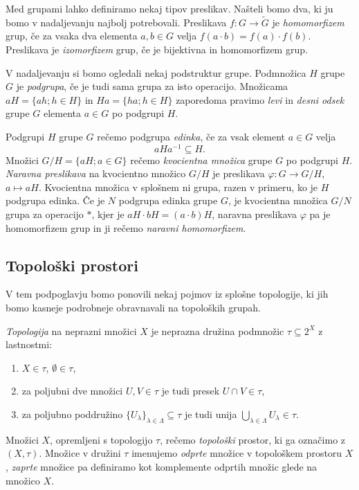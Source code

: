 \documentclass[mat1]{fmfdelo}
\begin{document}
Med grupami lahko definiramo nekaj tipov preslikav. Našteli bomo dva, ki ju bomo v nadaljevanju najbolj potrebovali.
Preslikava $f\colon G \to \widetilde{G}$ je \emph{homomorfizem} grup, če za vsaka dva elementa $a, b \in G$ velja $f(a\cdot b) = f(a)\cdot f(b)$.
Preslikava je \emph{izomorfizem} grup, če je bijektivna in homomorfizem grup.

V nadaljevanju si bomo ogledali nekaj podstruktur grupe.
Podmnožica $H$ grupe $G$ je \emph{podgrupa}, če je tudi sama grupa za isto operacijo.
Množicama $aH = \lbrace ah ; h \in H \rbrace$ in $Ha = \lbrace ha ; h \in H \rbrace$ zaporedoma pravimo \emph{levi} in \emph{desni odsek} grupe $G$ elementa $a \in G$ po podgrupi $H$.

Podgrupi $H$ grupe $G$ rečemo podgrupa \emph{edinka}, če za vsak element $a \in G$ velja \[aHa^{-1} \subseteq H.\]
Množici $G/H = \lbrace aH ; a \in G \rbrace$ rečemo \emph{kvocientna množica} grupe $G$ po podgrupi $H$.
\emph{Naravna preslikava} na kvocientno množico $G/H$ je preslikava $\varphi: G \to G/H$, $a \mapsto aH$.
Kvocientna množica v splošnem ni grupa, razen v primeru, ko je $H$ podgrupa edinka.
Če je $N$ podgrupa edinka grupe $G$, je kvocientna množica $G/N$ grupa za operacijo $*$, kjer je $aH\cdot bH = (a\cdot b)H$, naravna preslikava $\varphi$ pa je homomorfizem grup in ji rečemo \emph{naravni homomorfizem}.

\subsection{Topološki prostori}
V tem podpoglavju bomo ponovili nekaj pojmov iz splošne topologije, ki jih bomo kasneje podrobneje obravnavali na topoloških grupah.

\emph{Topologija} na neprazni množici $X$ je neprazna družina podmnožic $\tau \subseteq 2^X$ z lastnostmi:
\begin{enumerate}
\item $X \in \tau$, $\emptyset \in \tau$,
\item za poljubni dve množici $U,V \in \tau$ je tudi presek $U \cap V \in \tau$,
\item za poljubno poddružino $\lbrace U_{\lambda} \rbrace_{\lambda \in \Lambda} \subseteq \tau$ je tudi unija $\bigcup\limits_{\lambda \in \Lambda}^{} U_{\lambda} \in \tau$.
\end{enumerate}
Množici $X$, opremljeni s topologijo $\tau$, rečemo \emph{topološki} prostor, ki ga označimo z $(X, \tau)$. Množice v družini $\tau$ imenujemo \emph{odprte} množice v topološkem prostoru $X$, \emph{zaprte} množice pa definiramo kot komplemente odprtih množic glede na množico $X$.
\end{document}
